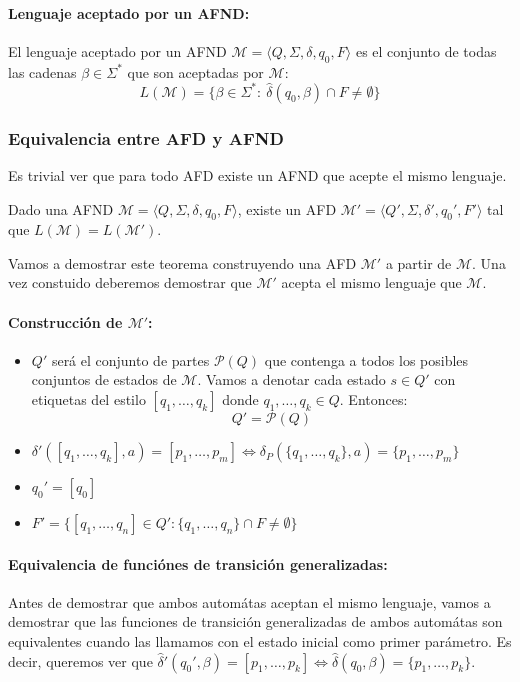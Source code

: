 \paragraph{Lenguaje aceptado por un AFND:} El lenguaje aceptado por un AFND \(\mathcal{M} = \langle Q, \Sigma, \delta, q_0, F\rangle\) es el conjunto de todas las cadenas \(\beta\in\Sigma^*\) que son aceptadas por \(\mathcal{M}\):
\[ L(\mathcal{M}) = \{ \beta\in\Sigma^*:~\hat{\delta}(q_0,\beta)\cap F \neq \emptyset\}\]

\subsubsection{Equivalencia entre AFD y AFND}
Es trivial ver que para todo AFD existe un AFND que acepte el mismo lenguaje.

\begin{teorema}
  Dado una AFND \(\mathcal{M} = \langle Q, \Sigma, \delta, q_0, F\rangle\), existe un AFD \(\mathcal{M}' = \langle Q', \Sigma, \delta', q_0', F'\rangle\) tal que \(L(\mathcal{M}) = L(\mathcal{M}')\).
\end{teorema}
Vamos a demostrar este teorema construyendo una AFD \(\mathcal{M}'\) a partir de \(\mathcal{M}\). Una vez constuido deberemos demostrar que \(\mathcal{M}'\) acepta el mismo lenguaje que \(\mathcal{M}\).

\paragraph{Construcción de \(\mathcal{M}'\):}
\begin{itemize}
  \item \(Q'\) será el conjunto de partes \(\mathcal{P}(Q)\) que contenga a todos los posibles conjuntos de estados de \(\mathcal{M}\). Vamos a denotar cada estado \(s\in Q'\) con etiquetas del estilo \([q_1,\dots, q_k]\) donde \(q_1,\dots,q_k\in Q\). Entonces:
        \[ Q' = \mathcal{P}(Q)\]
  \item \(\delta'([q_1,\dots, q_k],a) = [p_1, \dots, p_m] \iff \delta_P(\{q_1,\dots,q_k\},a) = \{p_1,\dots,p_m\}\)
  \item \(q_0' = [q_0]\)
  \item \(F' = \{ [q_1,\dots, q_n]\in Q' : \{q_1,\dots,q_n\}\cap F \neq \emptyset\}\)
\end{itemize}

\paragraph{Equivalencia de funciónes de transición generalizadas:} Antes de demostrar que ambos automátas aceptan el mismo lenguaje, vamos a demostrar que las funciones de transición generalizadas de ambos automátas son equivalentes cuando las llamamos con el estado inicial como primer parámetro. Es decir, queremos ver que \(\hat{\delta}'(q_0',\beta) = [p_1,\dots,p_k] \iff \hat{\delta}(q_0,\beta) = \{p_1,\dots, p_k\}\).

